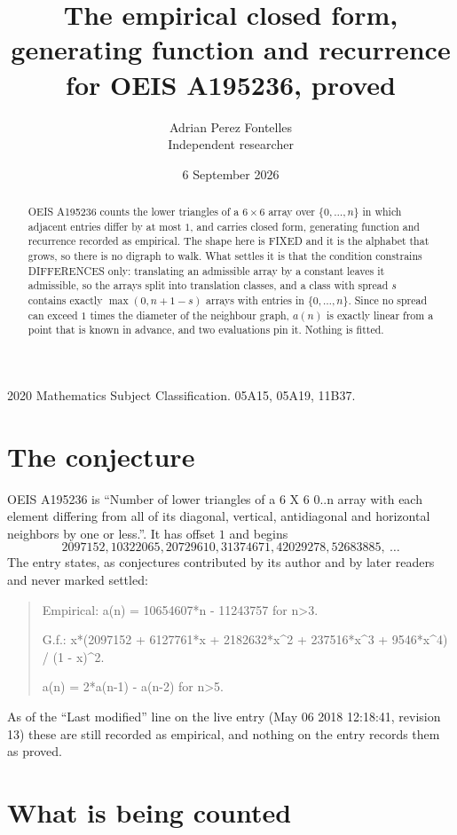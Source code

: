 \documentclass[11pt,a4paper]{article}
\title{The empirical closed form, generating function and recurrence for OEIS A195236, proved}
\author{Adrian Perez Fontelles\\ \small Independent researcher}
\date{6 September 2026}
\theoremstyle{plain}
\theoremstyle{definition}
\begin{document}
\maketitle

\begin{abstract}
OEIS A195236 counts the lower triangles of a $6\times6$ array over $\{0,\dots,n\}$ in which
adjacent entries differ by at most $1$, and carries closed form, generating function and recurrence recorded as empirical. The shape here is FIXED
and it is the alphabet that grows, so there is no digraph to walk. What settles it is that the
condition constrains DIFFERENCES only: translating an admissible array by a constant leaves it
admissible, so the arrays split into translation classes, and a class with spread $s$ contains
exactly $\max(0,n+1-s)$ arrays with entries in $\{0,\dots,n\}$. Since no spread can exceed
$1$ times the diameter of the neighbour graph, $a(n)$ is exactly linear from a point that is
known in advance, and two evaluations pin it. Nothing is fitted.
\end{abstract}

\noindent\small 2020 Mathematics Subject Classification. 05A15, 05A19, 11B37.\normalsize

\section{The conjecture}

OEIS A195236 is ``Number of lower triangles of a 6 X 6 0..n array with each element differing from all of its diagonal, vertical, antidiagonal and horizontal neighbors by one or less.''. It has offset $1$ and begins
\[
2097152, 10322065, 20729610, 31374671, 42029278, 52683885,\ \dots
\]
The entry states, as conjectures contributed by its author and by later readers and never
marked settled:
\begin{quote}
Empirical: a(n) = 10654607*n - 11243757 for n>3.

G.f.: x*(2097152 + 6127761*x + 2182632*x\^{}2 + 237516*x\^{}3 + 9546*x\^{}4) / (1 - x)\^{}2.

a(n) = 2*a(n-1) - a(n-2) for n>5.
\end{quote}
As of the ``Last modified'' line on the live entry (May 06 2018 12:18:41, revision 13) these are still
recorded as empirical, and nothing on the entry records them as proved.

\section{What is being counted}
\end{document}
